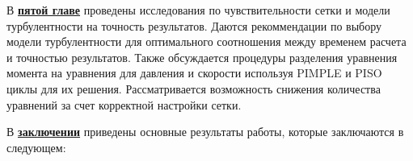 В \underline{\textbf{пятой главе}} проведены исследования по чувствительности сетки и модели турбулентности на точность результатов. Даются рекоммендации по выбору модели турбулентности для оптимального соотношения между временем расчета и точностью результатов. Также обсуждается процедуры разделения уравнения момента на уравнения для давления и скорости используя PIMPLE и PISO циклы для их решения. Рассматривается возможность снижения количества уравнений за счет корректной настройки сетки. 


\FloatBarrier
{}                                  %
В \underline{\textbf{заключении}} приведены основные результаты работы, которые заключаются в следующем:




